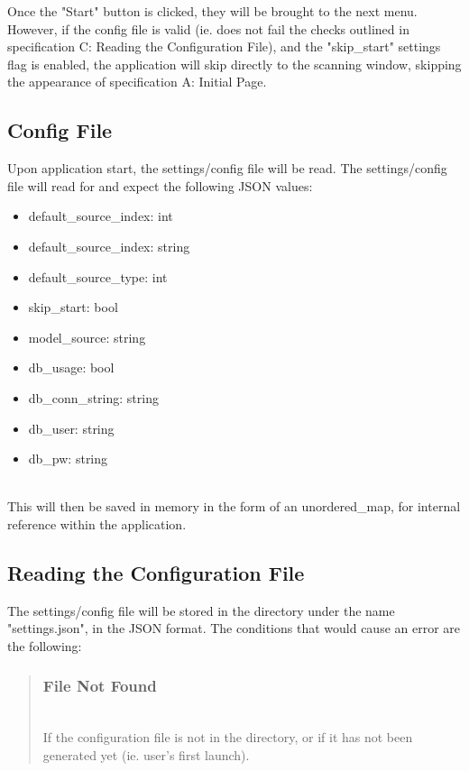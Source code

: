 \documentclass[conference]{IEEEtran}
\begin{document}
Once the "Start" button is clicked, they will be brought to the next menu. However, if the config file is valid (ie. does not fail the checks outlined in specification C: Reading the Configuration File), and the "skip\_start" settings flag is enabled, the application will skip directly to the scanning window, skipping the appearance of specification A: Initial Page.~\\

\subsection{Config File}
Upon application start, the settings/config file will be read. The settings/config file will read for and expect the following JSON values:~\\

\begin{itemize}
\item default\_source\_index: int
\item default\_source\_index: string
\item default\_source\_type: int
\item skip\_start: bool
\item model\_source: string
\item db\_usage: bool
\item db\_conn\_string: string
\item db\_user: string
\item db\_pw: string
\end{itemize}~\\

This will then be saved in memory in the form of an unordered\_map, for internal reference within the application.~\\

\subsection{Reading the Configuration File}
The settings/config file will be stored in the directory under the name "settings.json", in the JSON format. The conditions that would cause an error are the following:~\\

\begin{quote}
\subsubsection{File Not Found}~\\
If the configuration file is not in the directory, or if it has not been generated yet (ie. user's first launch).
\end{quote}
\end{document}
